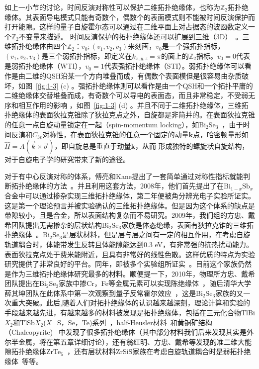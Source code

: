 如上一小节的讨论，时间反演对称性可以保护二维拓扑绝缘体，也称为$\mathbb{Z}_2$拓扑绝缘体。其表面导电模式只能有奇数个，偶数个的表面模式则不能被时间反演保护而打开能隙。这样的量子自旋霍尔态可以通过在二维平面上对占据态的波函数定义一个$\mathbb{Z}_2$不变量来描述。
时间反演保护的拓扑绝缘体还可以扩展到三维（3D）~\citep{Fu2007topo,Fu2007IS}。三维拓扑绝缘体由四个$\mathbb{Z}_2$：$v_0;(v_1,v_2,v_3)$来刻画，$v_0$是一个强拓扑指标，$(v_1,v_2,v_3)$是三个弱拓扑指标，即定义在$k_{x,y,z}=\pi$的面上的$\mathbb{Z}_2$指标。$v_0=0$代表是弱拓扑绝缘体（WTI），$v_0=1$代表强拓扑绝缘体（STI）。弱拓扑绝缘体可以看作是由二维的QSH沿某一个方向堆叠而成，有偶数个表面模但是很容易由杂质破坏，如图~\ref{fig:1-3} (c) 。强拓扑绝缘体则可以看作是由一个QSH和一个拓扑平庸的二维绝缘体交替堆叠而成，有奇数个可以导电的表面态，而且非常稳定，不受弱无序和相互作用的影响 ，如图~\ref{fig:1-3} (d) 。并且不同于二维拓扑绝缘体，三维拓扑绝缘体的表面狄拉克锥除了狄拉克点之外，自旋都是非简并的。在表面狄拉克锥的任意一点自旋动量锁定在一起（spin-momentum locking），如Bi$_2$Se$_3$~\citep{spin2013}，由于时间反演和$C_{3v}$对称性，在表面狄拉克锥的任意一个固定的动量$\mathbf{k}$点，哈密顿量形如$\hat{H}=
A (\vec{k} \times \vec{\sigma})$，即自旋总是垂直于动量$\mathbf{k}$，从而
形成独特的螺旋状自旋结构，对于自旋电子学的研究带来了新的途径。

对于有中心反演对称的体系，傅亮和Kane提出了一套简单通过对称性指标就能判断拓扑绝缘体的方法~\citep{Fu2007IS}。并且利用这套方法，2008年，他们首先提出了在$\mathrm{Bi}_{1-x} \mathrm{Sb}_{x}$合金中可以通过掺杂实现三维拓扑绝缘体\citep{fuBiSe}，第二年便被角分辨光电子实验所证实\citep{2009hsieh}。这是第一个理论预言并被实验确认的三维拓扑绝缘体。但是因为这个体系的缺点是带隙较小，且是合金，所以表面结构复杂而不易研究。2009年，我们组的方忠、戴希团队提出无需掺杂的层状结构Bi$_2$Se$_3$家族是体态绝缘，表面有狄拉克锥的三维拓扑绝缘体~\citep{zhang2009topological}。Bi$_2$Se$_3$是层状材料，但是层与层之间有一定的相互作用，在考虑自旋轨道耦合时，体能带发生反转且体能隙能达到0.3 eV，有非常强的抗热扰动能力。表面狄拉克点处于费米能附近，且具有非常好的线性色散。这样优质的特点为实验研究提供了非常良好的平台。同年，即被多个实验组所证实~\citep{chen2009experimental,xia2009,hsieh2009}。目前这个家族仍然是作为三维拓扑绝缘体研究最多的材料。顺便提一下，2010年，物理所方忠、戴希团队提出在Bi$_2 $Se$_3$家族中掺Cr，Fe等金属元素可以实现陈绝缘体~\citep{Yu61}，随后清华大学薛其坤团队在此体系中第一次观察到量子反常霍尔效应~\citep{xue13}，这是Bi$_2 $Se$_3$家族的又一次重大突破。此后,随着人们对拓扑绝缘体的认识越来越深刻，理论计算和实验的手段越来越先进，有越来越多的材料被发现是拓扑绝缘体，包括在三元化合物TlBi$X_2$和TlSb$X_2$($X$=S，Se，Te)系列~\citep{Yan2010,chen10}，half-Heusler材料~\citep{half2010}和黄铜矿结构（Chalcopyrite) ~\citep{Feng2011}中发现了很多拓扑绝缘体（其中部分材料我们后来发现其实是外尔半金属，将在第五章详细讨论），还有翁红明、方忠、戴希等发现的准二维大能隙拓扑绝缘体ZrTe$_5$~\citep{wengzrte}，还有层状材料ZrSiS家族在考虑自旋轨道耦合时是弱拓扑绝缘体~\citep{xu2015two}等等。

